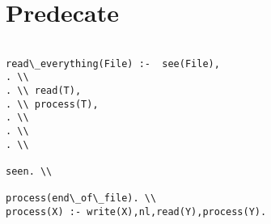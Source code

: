 \documentclass[a4paper,12pt]{article}
\begin{document}
\section{Predecate}


\begin{verbatim}

read\_everything(File) :-  see(File),
. \\ 
. \\ read(T),
. \\ process(T),
. \\
. \\
. \\

seen. \\

process(end\_of\_file). \\
process(X) :- write(X),nl,read(Y),process(Y).

\end{verbatim}
\end{document}
